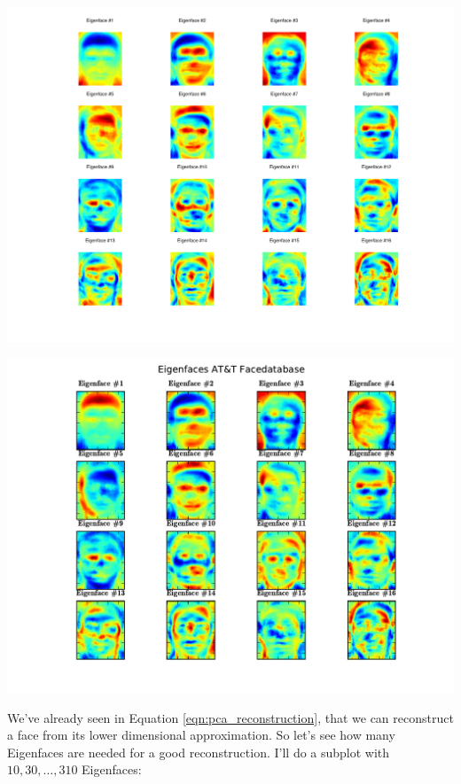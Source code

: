 \ifx\python\undefined
\begin{center}
	\includegraphics[scale=0.6]{img/eigenfaces/octave_pca_eigenfaces}
\end{center}
\else
	\begin{center}
		\includegraphics[scale=0.6]{img/eigenfaces/python_pca_eigenfaces}
	\end{center}
\fi

We've already seen in Equation \ref{eqn:pca_reconstruction}, that we can reconstruct a face from its lower dimensional approximation. So let's see how many Eigenfaces are needed for a good reconstruction. I'll do a subplot with $10,30,\ldots,310$ Eigenfaces:

\ifx\python\undefined
	
\else
	
\fi

